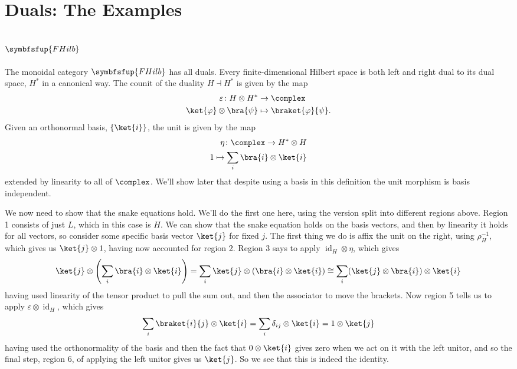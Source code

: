 \documentclass[fleqn]{NotesClass}
\makeatletter
\newcommand{\c@egory}[1]{\symbfsfup{#1}}
\newcommand{\FHilb}{\c@egory{FHilb}}
\DeclareMathOperator{\id}{id}
\newcommand{\isomorphic}{\cong}
\newcommand{\leftdual}{\dashv}
\makeatother
\begin{document}
    \section{Duals: The Examples}
    \subsection{\texorpdfstring{\(\FHilb\)}{Hilb}}
    The monoidal category \(\FHilb\) has all duals.
    Every finite-dimensional Hilbert space is both left and right dual to its dual space, \(H^*\) in a canonical way.
    The counit of the duality \(H \leftdual H^*\) is given by the map
    \begin{align}
        \varepsilon \colon H \otimes H^* &\to \complex\\
        \ket{\varphi} \otimes \bra{\psi} &\mapsto \braket{\varphi}{\psi}.
    \end{align}
    Given an orthonormal basis, \(\{\ket{i}\}\), the unit is given by the map
    \begin{align}
        \eta \colon \complex \to H^* \otimes H\\
        1 \mapsto \sum_i \bra{i} \otimes \ket{i}
    \end{align}
    extended by linearity to all of \(\complex\).
    We'll show later that despite using a basis in this definition the unit morphism is basis independent.
    
    We now need to show that the snake equations hold.
    We'll do the first one here, using the version split into different regions above.
    Region 1 consists of just \(L\), which in this case is \(H\).
    We can show that the snake equation holds on the basis vectors, and then by linearity it holds for all vectors, so consider some specific basis vector \(\ket{j}\) for fixed \(j\).
    The first thing we do is affix the unit on the right, using \(\rho_H^{-1}\), which gives us \(\ket{j} \otimes 1\), having now accounted for region 2.
    Region 3 says to apply \({\id_H} \otimes \eta\), which gives
    \begin{equation}
        \ket{j} \otimes \left( \sum_i \bra{i} \otimes \ket{i} \right) = \sum_i \ket{j} \otimes (\bra{i} \otimes \ket{i}) \isomorphic \sum_i (\ket{j} \otimes \bra{i}) \otimes \ket{i}
    \end{equation}
    having used linearity of the tensor product to pull the sum out, and then the associator to move the brackets.
    Now region 5 tells us to apply \(\varepsilon \otimes \id_H\), which gives
    \begin{equation}
        \sum_i \braket{i}{j} \otimes \ket{i} = \sum_i \delta_{ij} \otimes \ket{i} = 1 \otimes \ket{j}
    \end{equation}
    having used the orthonormality of the basis and then the fact that \(0 \otimes \ket{i}\) gives zero when we act on it with the left unitor, and so the final step, region 6, of applying the left unitor gives us \(\ket{j}\).
    So we see that this is indeed the identity.
    
\end{document}
